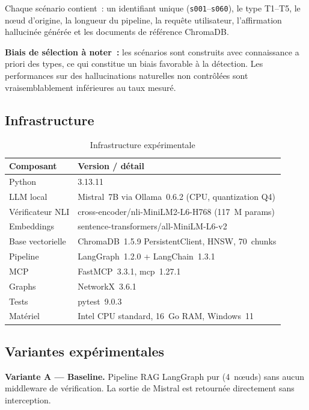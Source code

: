 \documentclass[12pt,a4paper]{article}
\begin{document}
Chaque scénario contient~: un identifiant unique (\texttt{s001}--\texttt{s060}), le type T1--T5, le nœud d'origine, la longueur du pipeline, la requête utilisateur, l'affirmation hallucinée générée et les documents de référence ChromaDB.

\textbf{Biais de sélection à noter~:} les scénarios sont construits avec connaissance a priori des types, ce qui constitue un biais favorable à la détection. Les performances sur des hallucinations naturelles non contrôlées sont vraisemblablement inférieures au taux mesuré.

\subsection{Infrastructure}

\begin{table}[H]
\centering
\caption{Infrastructure expérimentale}
\label{tab:infra}
\begin{tabular}{ll}
\toprule
\textbf{Composant} & \textbf{Version / détail} \\
\midrule
Python & 3.13.11 \\
LLM local & Mistral~7B via Ollama~0.6.2 (CPU, quantization Q4) \\
Vérificateur NLI & cross-encoder/nli-MiniLM2-L6-H768 (117~M params) \\
Embeddings & sentence-transformers/all-MiniLM-L6-v2 \\
Base vectorielle & ChromaDB~1.5.9 PersistentClient, HNSW, 70~chunks \\
Pipeline & LangGraph~1.2.0 + LangChain~1.3.1 \\
MCP & FastMCP~3.3.1, mcp~1.27.1 \\
Graphs & NetworkX~3.6.1 \\
Tests & pytest~9.0.3 \\
Matériel & Intel CPU standard, 16~Go RAM, Windows~11 \\
\bottomrule
\end{tabular}
\end{table}

\subsection{Variantes expérimentales}

\textbf{Variante A --- Baseline.}
Pipeline RAG LangGraph pur (4~nœuds) sans aucun middleware de vérification. La sortie de Mistral est retournée directement sans interception.
\end{document}
